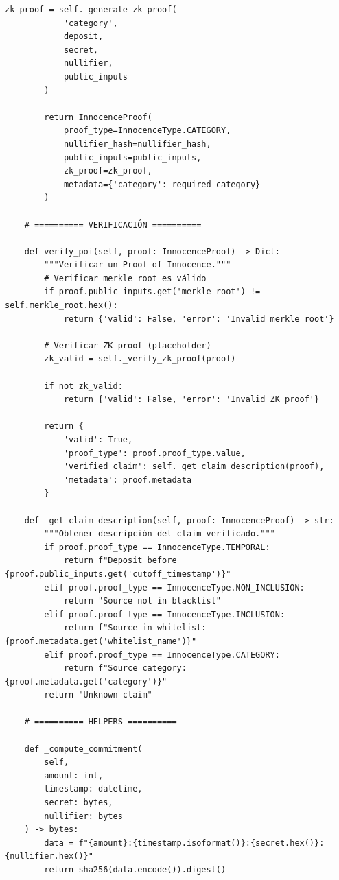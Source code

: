 \documentclass[11pt,a4paper,twoside]{book}
\theoremstyle{definition}
\theoremstyle{remark}
\begin{document}
\begin{lstlisting}[language=circom, caption={Circuito de Proof-of-Innocence temporal}]
        zk_proof = self._generate_zk_proof(
            'category',
            deposit,
            secret,
            nullifier,
            public_inputs
        )
        
        return InnocenceProof(
            proof_type=InnocenceType.CATEGORY,
            nullifier_hash=nullifier_hash,
            public_inputs=public_inputs,
            zk_proof=zk_proof,
            metadata={'category': required_category}
        )
    
    # ========== VERIFICACIÓN ==========
    
    def verify_poi(self, proof: InnocenceProof) -> Dict:
        """Verificar un Proof-of-Innocence."""
        # Verificar merkle root es válido
        if proof.public_inputs.get('merkle_root') != self.merkle_root.hex():
            return {'valid': False, 'error': 'Invalid merkle root'}
        
        # Verificar ZK proof (placeholder)
        zk_valid = self._verify_zk_proof(proof)
        
        if not zk_valid:
            return {'valid': False, 'error': 'Invalid ZK proof'}
        
        return {
            'valid': True,
            'proof_type': proof.proof_type.value,
            'verified_claim': self._get_claim_description(proof),
            'metadata': proof.metadata
        }
    
    def _get_claim_description(self, proof: InnocenceProof) -> str:
        """Obtener descripción del claim verificado."""
        if proof.proof_type == InnocenceType.TEMPORAL:
            return f"Deposit before {proof.public_inputs.get('cutoff_timestamp')}"
        elif proof.proof_type == InnocenceType.NON_INCLUSION:
            return "Source not in blacklist"
        elif proof.proof_type == InnocenceType.INCLUSION:
            return f"Source in whitelist: {proof.metadata.get('whitelist_name')}"
        elif proof.proof_type == InnocenceType.CATEGORY:
            return f"Source category: {proof.metadata.get('category')}"
        return "Unknown claim"
    
    # ========== HELPERS ==========
    
    def _compute_commitment(
        self, 
        amount: int, 
        timestamp: datetime, 
        secret: bytes, 
        nullifier: bytes
    ) -> bytes:
        data = f"{amount}:{timestamp.isoformat()}:{secret.hex()}:{nullifier.hex()}"
        return sha256(data.encode()).digest()
    

\end{lstlisting}
\end{document}
